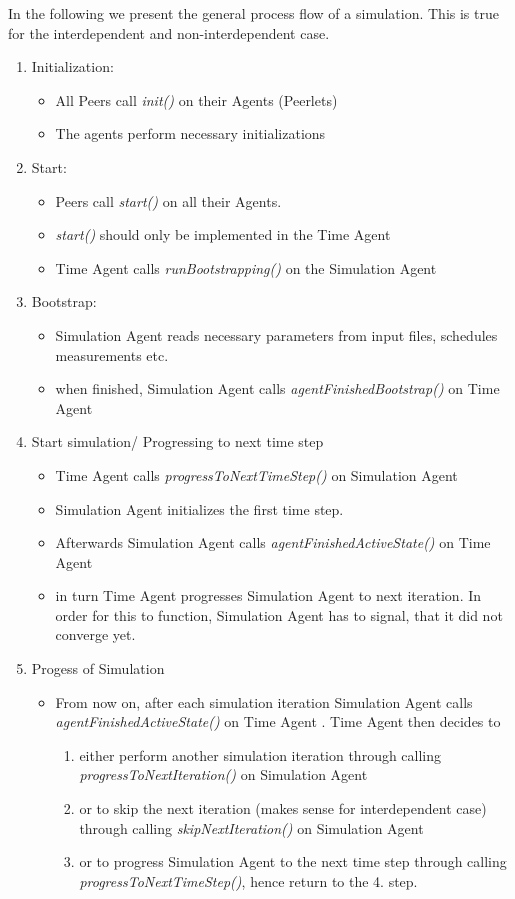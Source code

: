 \documentclass[11pt,fleqn]{book} %
\newcommand{\MainAgent}{Simulation Agent }
\newcommand{\TimeAgent}{Time Agent }
\begin{document}
In the following we present the general process flow of a simulation. This is true for the interdependent and non-interdependent case.
\begin{enumerate}
	\item Initialization:
	\begin{itemize}
		\item All Peers call \textit{init()} on their Agents (Peerlets)
		\item The agents perform necessary initializations
	\end{itemize}
	\item Start:
	\begin{itemize}
		\item Peers call \textit{start()} on all their Agents.
		\item \textit{start()} should only be implemented in the \TimeAgent
		\item \TimeAgent calls \textit{runBootstrapping()} on the \MainAgent
	\end{itemize}
	\item Bootstrap:
	\begin{itemize}
		\item \MainAgent reads necessary parameters from input files, schedules measurements etc.
		\item when finished, \MainAgent calls \textit{agentFinishedBootstrap()} on \TimeAgent
	\end{itemize}
	\item Start simulation/ Progressing to next time step
	\begin{itemize}
		\item \TimeAgent calls \textit{progressToNextTimeStep()} on \MainAgent
		\item \MainAgent initializes the first time step.
		\item Afterwards \MainAgent calls \textit{agentFinishedActiveState()} on \TimeAgent
		\item in turn \TimeAgent progresses \MainAgent to next iteration. In order for this to function, \MainAgent has to signal, that it did not converge yet.
	\end{itemize}
	\item Progess of Simulation
	\begin{itemize}
		\item From now on, after each simulation iteration \MainAgent calls \textit{agentFinishedActiveState()} on \TimeAgent. \TimeAgent then decides to 
		\begin{enumerate}[label=(\alph*)]
			\item either perform another simulation iteration through calling \textit{progressToNextIteration()} on \MainAgent
			\item or to skip the next iteration (makes sense for interdependent case) through calling \textit{skipNextIteration()} on \MainAgent
			\item or to progress \MainAgent to the next time step through calling \textit{progressToNextTimeStep()}, hence return to the 4. step.
		\end{enumerate}  
	\end{itemize}
\end{enumerate}
\end{document}
